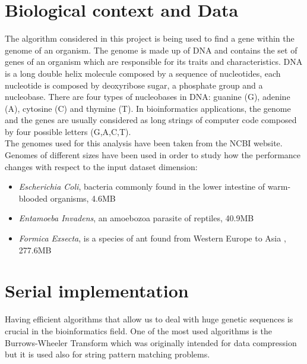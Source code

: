 \documentclass[final,5p,times,twocolumn,authoryear]{elsarticle}
\begin{document}
\section{Biological context and Data}
\label{Biological context and Data}
The algorithm considered in this project is being used to find a gene within the genome of an organism. The genome is made up of DNA and contains the set of genes of an organism which are responsible for its traits and characteristics.
DNA is a long double helix molecule composed by a sequence of nucleotides\cite{nucleotide}, each nucleotide is composed by deoxyribose sugar, a phosphate group and a nucleobase. There are four types of nucleobases in DNA: guanine (G), adenine (A), cytosine (C) and thymine (T).
In bioinformatics applications, the genome and the genes are usually considered as long strings of computer code composed by four possible letters (G,A,C,T). \\
The genomes used for this analysis have been taken from the NCBI website\cite{ncbi}. \\
Genomes of different sizes have been used in order to study how the performance changes with respect to the input dataset dimension:
\begin{itemize}
    \item \emph{Escherichia Coli}, bacteria commonly found in the lower intestine of warm-blooded organisms\cite{ecoli}, 4.6MB \cite{ecoli dataset}
    \item \emph{Entamoeba Invadens}, an amoebozoa parasite of reptiles\cite{entamoeba}, 40.9MB \cite{entamoeba dataset}
    \item \emph{Formica Exsecta}, is a species of ant found from Western Europe to Asia \cite{formica}, 277.6MB \cite{formica dataset}
\end{itemize}


\section{Serial implementation}
Having efficient algorithms that allow us to deal with huge genetic sequences is crucial in the bioinformatics field. One of the most used algorithms is the Burrows-Wheeler Transform which was originally intended for data compression but it is used also for string pattern matching problems.
\end{document}
